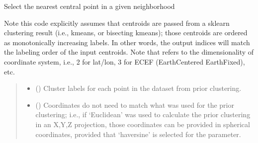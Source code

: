 \documentclass[letterpaper,10pt,english]{sphinxmanual}
\begin{document}
\begin{fulllineitems}
\label{\detokenize{pgamit.classes:pgamit.classes.NetClusters.select_central_point}}
\pysigstartsignatures
\pysiglinewithargsret
{}
{\sphinxparamcomma {}\sphinxparamcomma {}\sphinxparamcomma {}}
{}
\pysigstopsignatures
\sphinxAtStartPar
Select the nearest central point in a given neighborhood

\sphinxAtStartPar
Note this code explicitly assumes that centroids are passed from a
sklearn clustering result (i.e., kmeans, or bisecting kmeans); those
centroids are ordered as monotonically increasing labels. In other words,
the output indices will match the labeling order of the input centroids.
Note that  refers to the dimensionality of coordinate system,
i.e., 2 for lat/lon, 3 for ECEF (Earth\sphinxhyphen{}Centered Earth\sphinxhyphen{}Fixed), etc.
\begin{quote}\begin{description}
\begin{itemize}
\item {} 
\sphinxAtStartPar
{} (\sphinxstyleliteralemphasis{\sphinxupquote{, }}\sphinxstyleliteralemphasis{\sphinxupquote{ (}}\sphinxstyleliteralemphasis{\sphinxupquote{,}}\sphinxstyleliteralemphasis{\sphinxupquote{)}}) \textendash{} Cluster labels for each point in the dataset from prior clustering.

\item {} 
\sphinxAtStartPar
{} (\sphinxstyleliteralemphasis{\sphinxupquote{ (}}\sphinxstyleliteralemphasis{\sphinxupquote{, }}\sphinxstyleliteralemphasis{\sphinxupquote{)}}) \textendash{} Coordinates do not need to match what was used for the prior
clustering; i.e., if ‘Euclidean’ was used to calculate the prior
clustering in an X,Y,Z projection, those coordinates can be provided in
spherical coordinates, provided that ‘haversine’ is selected for the
 parameter.


\end{itemize}
\end{description}
\end{quote}
\end{fulllineitems}
\end{document}
